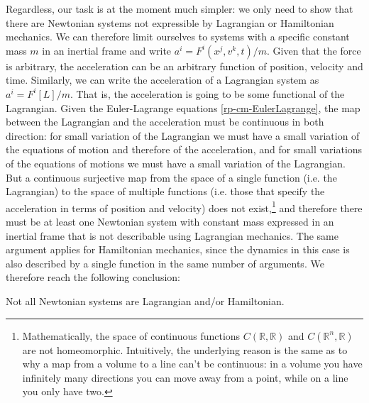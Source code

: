 Regardless, our task is at the moment much simpler: we only need to show that there are Newtonian systems not expressible by Lagrangian or Hamiltonian mechanics. We can therefore limit ourselves to systems with a specific constant mass $m$ in an inertial frame and write $a^i=F^i(x^j, v^k, t)/m$. Given that the force is arbitrary, the acceleration can be an arbitrary function of position, velocity and time. Similarly, we can write the acceleration of a Lagrangian system as $a^i=F^i[L]/m$. That is, the acceleration is going to be some functional of the Lagrangian. Given the Euler-Lagrange equations \ref{rp-cm-EulerLagrange}, the map between the Lagrangian and the acceleration must be continuous in both direction: for small variation of the Lagrangian we must have a small variation of the equations of motion and therefore of the acceleration, and for small variations of the equations of motions we must have a small variation of the Lagrangian. But a continuous surjective map from the space of a single function (i.e. the Lagrangian) to the space of multiple functions (i.e. those that specify the acceleration in terms of position and velocity) does not exist,\footnote{Mathematically, the space of continuous functions $C(\mathbb{R}, \mathbb{R})$ and $C(\mathbb{R}^n, \mathbb{R})$ are not homeomorphic. Intuitively, the underlying reason is the same as to why a map from a volume to a line can't be continuous: in a volume you have infinitely many directions you can move away from a point, while on a line you only have two.} and therefore there must be at least one Newtonian system with constant mass expressed in an inertial frame that is not describable using Lagrangian mechanics. The same argument applies for Hamiltonian mechanics, since the dynamics in this case is also described by a single function in the same number of arguments. We therefore reach the following conclusion:
\begin{insight}
	Not all Newtonian systems are Lagrangian and/or Hamiltonian.
\end{insight}

